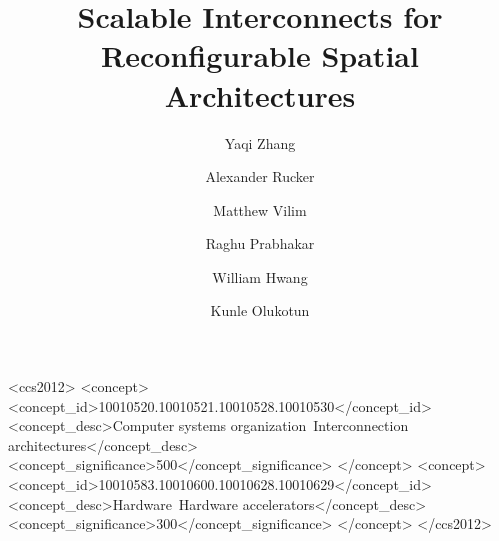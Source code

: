 \documentclass[sigconf]{acmart}
\begin{document}
%
\title{Scalable Interconnects for Reconfigurable Spatial Architectures}

%

\author{Yaqi Zhang}
\author{Alexander Rucker}
\author{Matthew Vilim}
\author{Raghu Prabhakar}
\author{William Hwang}
\author{Kunle Olukotun}

%
\renewcommand{\shortauthors}{Y. Zhang and A. Rucker, et al.}

%

%
%
\begin{CCSXML}
<ccs2012>
<concept>
<concept_id>10010520.10010521.10010528.10010530</concept_id>
<concept_desc>Computer systems organization~Interconnection architectures</concept_desc>
<concept_significance>500</concept_significance>
</concept>
<concept>
<concept_id>10010583.10010600.10010628.10010629</concept_id>
<concept_desc>Hardware~Hardware accelerators</concept_desc>
<concept_significance>300</concept_significance>
</concept>
</ccs2012>
\end{CCSXML}
\end{document}
